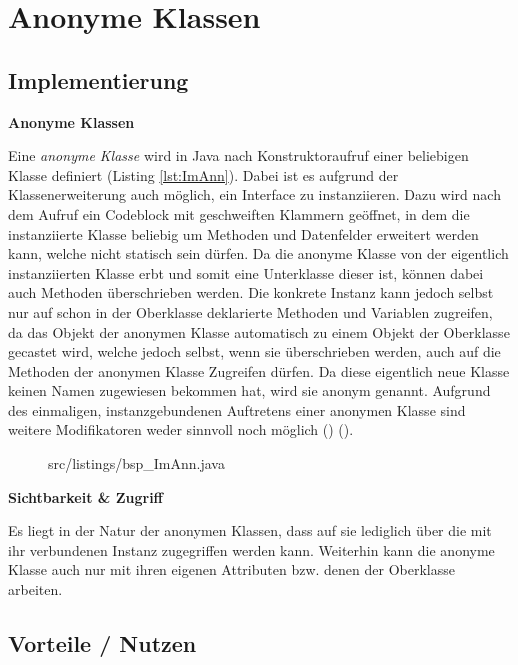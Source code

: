 \section{Anonyme Klassen}
\subsection {Implementierung}

{\Large \bf Anonyme Klassen}

Eine {\it anonyme Klasse} wird in Java nach Konstruktoraufruf einer beliebigen Klasse definiert (Listing \ref{lst:ImAnn}). Dabei ist es aufgrund der Klassenerweiterung auch möglich, ein Interface zu instanziieren.
Dazu wird nach dem Aufruf ein Codeblock mit geschweiften Klammern geöffnet, in dem die instanziierte Klasse beliebig um Methoden und Datenfelder erweitert werden kann, welche nicht statisch sein dürfen.
Da die anonyme Klasse von der eigentlich instanziierten Klasse erbt und somit eine Unterklasse dieser ist, können dabei auch Methoden überschrieben werden.
Die konkrete Instanz kann jedoch selbst nur auf schon in der Oberklasse deklarierte Methoden und Variablen zugreifen, da das Objekt der anonymen Klasse automatisch zu einem Objekt der Oberklasse gecastet wird, welche jedoch selbst, wenn sie überschrieben werden, auch auf die Methoden der anonymen Klasse Zugreifen dürfen.
Da diese eigentlich neue Klasse keinen Namen zugewiesen bekommen hat, wird sie anonym genannt.
Aufgrund des einmaligen, instanzgebundenen Auftretens einer anonymen Klasse sind weitere Modifikatoren weder sinnvoll noch möglich (\cite{goll2013java}) (\cite{Oracle:JLS9}).

\begin{figure}[hbt]
\lstset{language=Java}
 {src/listings/bsp_ImAnn.java}
\end{figure}

{\bf Sichtbarkeit \& Zugriff}

Es liegt in der Natur der anonymen Klassen, dass auf sie lediglich über die mit ihr verbundenen Instanz zugegriffen werden kann.
Weiterhin kann die anonyme Klasse auch nur mit ihren eigenen Attributen bzw. denen der Oberklasse arbeiten.

\subsection{Vorteile / Nutzen}

